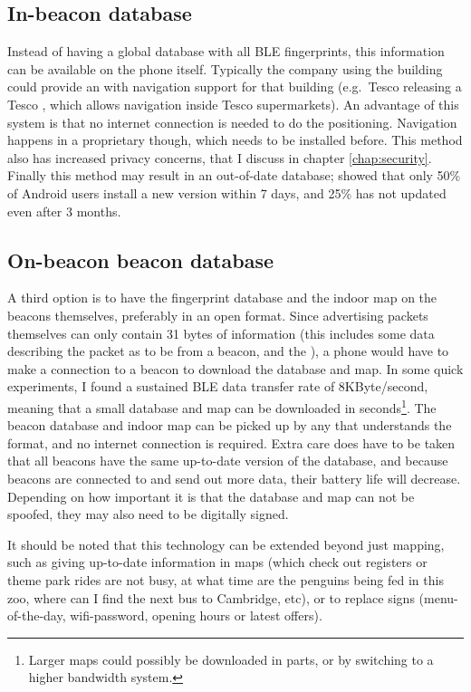 \subsection{In-\app beacon database}
\label{sec:architecture-in-app-database}
Instead of having a global database with all BLE fingerprints, this information can be available on the phone itself.
Typically the company using the building could provide an \app with navigation support for that building (e.g.\ Tesco releasing a Tesco \app, which allows navigation inside Tesco supermarkets).
An advantage of this system is that no internet connection is needed to do the positioning.
Navigation happens in a proprietary \app though, which needs to be installed before.
This method also has increased privacy concerns, that I discuss in chapter \ref{chap:security}.
Finally this method may result in an out-of-date database; \citet{moller2012update} showed that only 50\% of Android users install a new \app version within 7 days, and 25\% has not updated even after 3 months.

\subsection{On-beacon beacon database}
A third option is to have the fingerprint database and the indoor map on the beacons themselves, preferably in an open format.
Since advertising packets themselves can only contain 31 bytes of information (this includes some data describing the packet as to be from a beacon, and the \bid), a phone would have to make a connection to a beacon to download the database and map.
In some quick experiments, I found a sustained BLE data transfer rate of 8KByte/second, meaning that a small database and map can be downloaded in seconds\footnote{Larger maps could possibly be downloaded in parts, or by switching to a higher bandwidth system.}.
The beacon database and indoor map can be picked up by any \app that understands the format, and no internet connection is required.
Extra care does have to be taken that all beacons have the same up-to-date version of the database, and because beacons are connected to and send out more data, their battery life will decrease.
Depending on how important it is that the database and map can not be spoofed, they may also need to be digitally signed.

It should be noted that this technology can be extended beyond just mapping, such as giving up-to-date information in maps (which check out registers or theme park rides are not busy, at what time are the penguins being fed in this zoo, where can I find the next bus to Cambridge, etc), or to replace signs (menu-of-the-day, wifi-password, opening hours or latest offers). 

